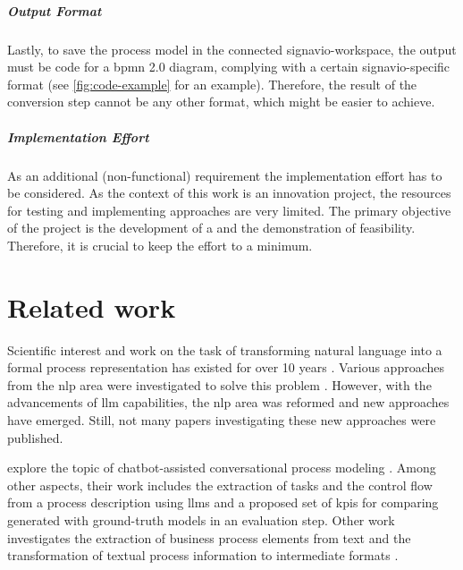 \paragraph{Output Format}
Lastly, to save the process model in the connected \gls{signavio-workspace}, the output must be code for a \acs{bpmn} 2.0 diagram, complying with a certain \gls{signavio}-specific format (see \autoref{fig:code-example} for an example). Therefore, the result of the conversion step cannot be any other format, which might be easier to achieve.

\paragraph{Implementation Effort}
As an additional (non-functional) requirement the implementation effort has to be considered. As the context of this work is an innovation project, the resources for testing and implementing approaches are very limited. The primary objective of the project is the development of a  and the demonstration of feasibility. Therefore, it is crucial to keep the effort to a minimum.

\chapter{Related work}\label{chapter:related-work}
Scientific interest and work on the task of transforming natural language into a formal process representation has existed for over 10 years \citep{process-extraction-from-text}. Various approaches from the \acs{nlp} area were investigated to solve this problem \citep{investigation-text-to-bpmn}. However, with the advancements of \gls{llm} capabilities, the \acs{nlp} area was reformed and new approaches have emerged. Still, not many papers investigating these new approaches were published.

\citeauthor{conversational-process-modelling} explore the topic of chatbot-assisted conversational process modeling \citep{conversational-process-modelling}. Among other aspects, their work includes the extraction of tasks and the control flow from a process description using \glspl{llm} and a proposed set of \acsp{kpi} for comparing generated with ground-truth models in an evaluation step. Other work investigates the extraction of business process elements from text \cite{text-to-bp-elem} and the transformation of textual process information to intermediate formats \cite{text-to-inter-rep}.

